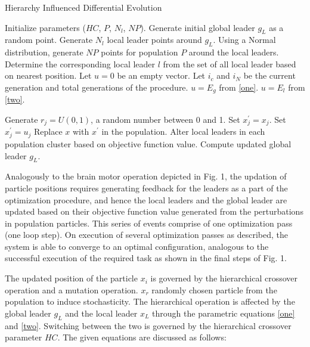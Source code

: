\begin{algorithm}
\caption{Hierarchy Influenced Differential Evolution}
\label{algo}
\begin{algorithmic}[1]
    \State Initialize parameters ($HC$, $P$, $N_l$, $NP$).
    \State Generate initial global leader $g_L$ as a random point.
    \State Generate $N_l$ local leader points around $g_L$.
    \State Using a Normal distribution, generate $NP$ points for population $P$ around the local leaders.
        \State Determine the corresponding local leader $l$ from the set of all local leader based on nearest position.
        \State Let $u = 0$ be an empty vector.
        \State Let $i_c$ and $i_N$ be the current generation and total generations of the procedure.
          \State $u = E_g$ from \eqref{one}.
        \Else
          \State $u = E_l$ from \eqref{two}.
        \EndIf
        
          \State Generate $r_j = U(0, 1)$, a random number between 0 and 1.
            \State Set $x_j^{'} = x_j$.
          \Else
            \State Set $x_j^{'} = u_j$
          \EndIf
        \EndFor
          \State Replace $x$ with $x^{'}$ in the population.
        \EndIf
      \EndFor
      \State Alter local leaders in each population cluster based on objective function value.
      \State Compute updated global leader $g_L$.
    \EndWhile
  \EndProcedure
\end{algorithmic}
\end{algorithm}

Analogously to the brain motor operation depicted in Fig. 1, the updation of particle positions requires generating feedback for the leaders as a part of the optimization procedure, and hence the local leaders and the global leader are updated based on their objective function value generated from the perturbations in population particles. This series of events comprise of one optimization pass (one loop step). On execution of several optimization passes as described, the system is able to converge to an optimal configuration, analogous to the successful execution of the required task as shown in the final steps of Fig. 1.

The updated position of the particle $x_i$ is governed by the hierarchical crossover operation and a mutation operation.
$x_r$ randomly chosen particle from the population to induce stochasticity. The hierarchical operation is affected by the global leader $g_L$ and the local leader $x_L$ through the parametric equations \eqref{one} and \eqref{two}. Switching between the two is governed by the hierarchical crossover parameter $HC$. The given equations are discussed as follows:

